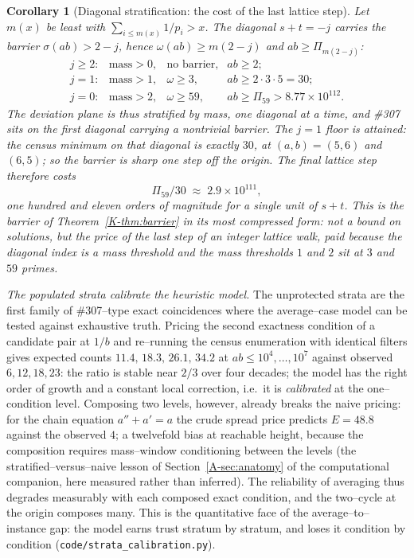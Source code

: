 \documentclass[11pt]{article}
\newtheorem{corollary}[theorem]{Corollary}
\theoremstyle{definition}
\begin{document}
\begin{corollary}[Diagonal stratification: the cost of the last lattice step]\label{cor:diagonals}
Let $m(x)$ be least with $\sum_{i\le m(x)}1/p_i>x$. The diagonal $s+t=-j$ carries the barrier
$\sigma(ab)>2-j$, hence $\omega(ab)\ge m(2-j)$ and $ab\ge\Pi_{m(2-j)}$:
\[
\begin{array}{llll}
j\ge2: & \text{mass}>0, & \text{no barrier}, & ab\ge2;\\
j=1:   & \text{mass}>1, & \omega\ge3,        & ab\ge2\cdot3\cdot5=30;\\
j=0:   & \text{mass}>2, & \omega\ge59,       & ab\ge\Pi_{59}>8.77\times10^{112}.
\end{array}
\]
The deviation plane is thus stratified by mass, one diagonal at a time, and \#307 sits on the first
diagonal carrying a nontrivial barrier. The $j=1$ floor is \emph{attained}: the census minimum on
that diagonal is exactly $30$, at $(a,b)=(5,6)$ and $(6,5)$; so the barrier is sharp one step off
the origin. The final lattice step therefore costs
\[ \Pi_{59}/30\;\approx\;2.9\times10^{111}, \]
one hundred and eleven orders of magnitude for a single unit of $s+t$. This is the barrier of
Theorem~\ref{K-thm:barrier} in its most compressed form: not a bound on solutions, but the price of
the last step of an integer lattice walk, paid because the diagonal index is a mass threshold and
the mass thresholds $1$ and $2$ sit at $3$ and $59$ primes.
\end{corollary}

\emph{The populated strata calibrate the heuristic model.} The unprotected strata are the first family of \#307--type exact coincidences where the
average--case model can be tested against exhaustive truth. Pricing the second exactness condition
of a candidate pair at $1/b$ and re--running the census enumeration with identical filters gives
expected counts $11.4,\,18.3,\,26.1,\,34.2$ at $ab\le10^4,\dots,10^7$ against observed
$6,12,18,23$: the ratio is stable near $2/3$ over four decades; the model has the right order of
growth and a constant local correction, i.e.\ it is \emph{calibrated} at the one--condition level.
Composing two levels, however, already breaks the naive pricing: for the chain equation $a''+a'=a$
the crude spread price predicts $E=48.8$ against the observed $4$; a twelvefold bias at
reachable height, because the composition requires mass--window conditioning between the levels
(the stratified--versus--naive lesson of Section~\ref{A-sec:anatomy} of the computational companion, here measured rather than
inferred). The reliability of averaging thus degrades measurably with each composed exact
condition, and the two--cycle at the origin composes many. This is the quantitative face of the
average--to--instance gap: the model earns trust stratum by stratum, and loses it condition by
condition (\texttt{code/strata\_calibration.py}).
\end{document}
